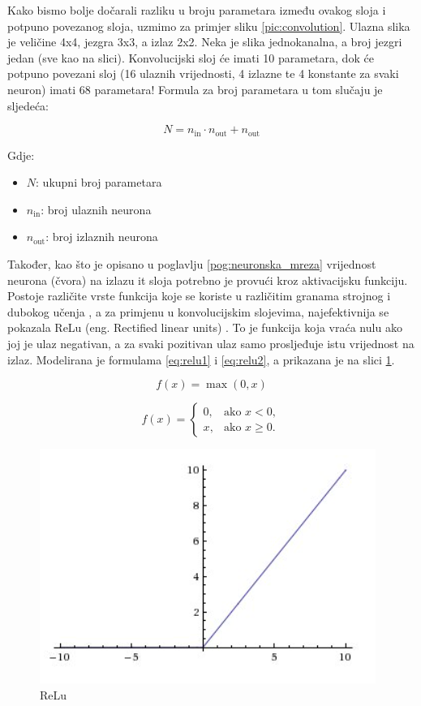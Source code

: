 Kako bismo bolje dočarali razliku u broju parametara između ovakog sloja i potpuno povezanog sloja,
uzmimo za primjer sliku \ref{pic:convolution}. Ulazna slika je veličine 4x4, jezgra 3x3, a izlaz 
2x2. Neka je slika jednokanalna, a broj jezgri jedan (sve kao na slici). Konvolucijski sloj
će imati 10 parametara, dok će potpuno povezani sloj (16 ulaznih vrijednosti, 4 izlazne te
4 konstante za svaki neuron) imati 68 parametara! Formula za broj parametara u tom slučaju
je sljedeća:

\begin{equation}
    N = n_{\text{in}} \cdot n_{\text{out}} + n_{\text{out}}
\end{equation}

Gdje:
\begin{itemize}
    \item \(N\): ukupni broj parametara
    \item \(n_{\text{in}}\): broj ulaznih neurona
    \item \(n_{\text{out}}\): broj izlaznih neurona
\end{itemize}

Također, kao što je opisano u poglavlju \ref{pog:neuronska_mreza} vrijednost neurona (čvora) na
izlazu it sloja potrebno je provući kroz aktivacijsku funkciju. Postoje različite vrste funkcija
koje se koriste u različitim granama strojnog i dubokog učenja \cite{activation_fcn}, a za
primjenu u konvolucijskim slojevima, najefektivnija se pokazala ReLu (eng. Rectified linear units)
\cite{relu}. To je funkcija koja vraća nulu ako joj je ulaz negativan, a za svaki pozitivan
ulaz samo prosljeđuje istu vrijednost na izlaz. Modelirana je formulama \ref{eq:relu1} i 
\ref{eq:relu2}, a prikazana je na slici \ref{pic:relu}. 

\begin{equation}
    f(x) = \max(0, x)
    \label{eq:relu1}
\end{equation}

\begin{equation}
    f(x) = 
    \begin{cases} 
        0, & \text{ako } x < 0, \\
        x, & \text{ako } x \geq 0.
    \end{cases}
    \label{eq:relu2}
\end{equation}

\begin{figure}[htb]
    \centering
    \includegraphics[width=0.5\linewidth]{Chapters/neuronska_mreza/CNN/relu.png} 
    \caption{ReLu \cite{relu}}
    \label{pic:relu}
\end{figure}

